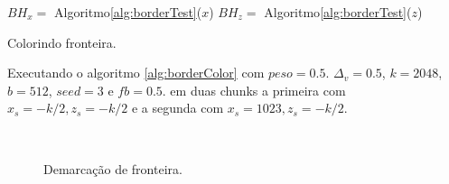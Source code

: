 \begin{algorithm}[H]\label{alg:borderColor}%
    $BH_{x} =$ Algoritmo\ref{alg:borderTest}($x$)\;
    $BH_{z} =$ Algoritmo\ref{alg:borderTest}($z$)\;
    
    
    \caption{Colorindo fronteira.}
\end{algorithm}

Executando o algoritmo \ref{alg:borderColor} com $peso = 0.5$. $\Delta_{v} = 0.5$, 
$k = 2048$, $b = 512$, $seed = 3$ e $fb = 0.5$. em duas chunks a primeira com $ x_{s} = -k/2 , z_{s} = -k/2$
e a segunda com $ x_{s} = 1023 , z_{s} = -k/2$.

\begin{figure}[H]
     \centering
     \hspace{0.1cm}
     \\
     \caption{Demarcação de fronteira.}
     
     \label{fig:borderlenanotherauxyeah}
\end{figure}

